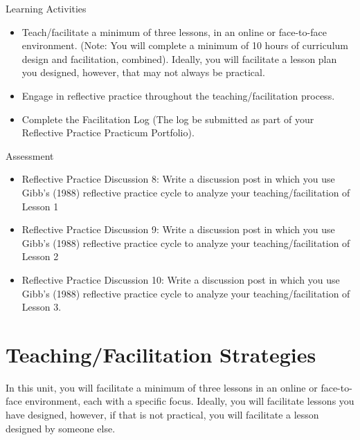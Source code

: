 \documentclass[
]{book}
\providecommand{\tightlist}{%
  \setlength{\itemsep}{0pt}\setlength{\parskip}{0pt}}
\begin{document}
\begin{reflect}
{Learning Activities }

\begin{itemize}
\tightlist
\item
  Teach/facilitate a minimum of three lessons, in an online or face-to-face environment. (Note: You will complete a minimum of 10 hours of curriculum design and facilitation, combined). Ideally, you will facilitate a lesson plan you designed, however, that may not always be practical.\\
\item
  Engage in reflective practice throughout the teaching/facilitation process.\\
\item
  Complete the Facilitation Log (The log be submitted as part of your Reflective Practice Practicum Portfolio).
\end{itemize}
\end{reflect}

\begin{assessment}
{Assessment}

\begin{itemize}
\tightlist
\item
  Reflective Practice Discussion 8: Write a discussion post in which you use Gibb's (1988) reflective practice cycle to analyze your teaching/facilitation of Lesson 1\\
\item
  Reflective Practice Discussion 9: Write a discussion post in which you use Gibb's (1988) reflective practice cycle to analyze your teaching/facilitation of Lesson 2\\
\item
  Reflective Practice Discussion 10: Write a discussion post in which you use Gibb's (1988) reflective practice cycle to analyze your teaching/facilitation of Lesson 3.
\end{itemize}
\end{assessment}

\hypertarget{teachingfacilitation-strategies}{%
\section{Teaching/Facilitation Strategies}\label{teachingfacilitation-strategies}}

In this unit, you will facilitate a minimum of three lessons in an online or face-to-face environment, each with a specific focus. Ideally, you will facilitate lessons you have designed, however, if that is not practical, you will facilitate a lesson designed by someone else.
\end{document}
